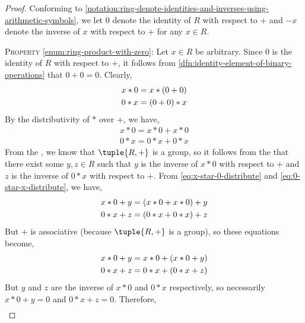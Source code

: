 \begin{proof}
    Conforming to \cref{notation:ring-denote-identities-and-inverses-using-arithmetic-symbols},
    we let \( 0 \) denote the identity of \( R \) with respect to \( + \) and \( -x \)
    denote the inverse of \( x \) with respect to \( + \) for any \( x \in R \).

    \vspace{0.3cm}
    \noindent
    \textsc{Property} \ref{enum:ring-product-with-zero}:
    Let \( x \in R \) be arbitrary. Since \( 0 \) is the identity of \( R \) with respect to \( + \),
    it follows from \cref{dfn:identity-element-of-binary-operations} that \( 0 + 0 = 0 \). Clearly,
    \begin{gather*}
        x \ast 0 = x \ast \mleft( 0 + 0 \mright)\\
        0 \ast x = \mleft( 0 + 0 \mright) \ast x
    \end{gather*}
    By the distributivity of \( \ast \) over \( + \), we have,
    \begin{gather}
        x \ast 0 = x \ast 0 + x \ast 0 \label{eq:x-star-0-distribute} \\
        0 \ast x = 0 \ast x + 0 \ast x \label{eq:0-star-x-distribute}
    \end{gather}
    From the , we know that \( \tuple{R, +} \) is a group, so it follows from the  that there exist
    some \( y,z \in R \) such that \( y \) is the inverse of \( x \ast 0 \) with respect to \( + \) and \( z \) is the inverse
    of \( 0 \ast x \) with respect to \( + \). From \eqref{eq:x-star-0-distribute} and \eqref{eq:0-star-x-distribute}, we have,
    \begin{gather*}
        x \ast 0 + y = \mleft( x \ast 0 + x \ast 0 \mright) + y\\
        0 \ast x + z = \mleft( 0 \ast x + 0 \ast x \mright) + z
    \end{gather*}
    But \( + \) is associative (because \( \tuple{R,+} \) is a group), so these equations become,
    \begin{gather*}
        x \ast 0 + y = x \ast 0 + \mleft( x \ast 0 + y \mright)\\
        0 \ast x + z = 0 \ast x + \mleft( 0 \ast x + z \mright)
    \end{gather*}
    But \( y \) and \( z \) are the inverse of \( x \ast 0 \) and \( 0 \ast x \) respectively, so necessarily \( x \ast 0 + y = 0 \)
    and \( 0 \ast x + z = 0 \). Therefore,
    \begin{gather*}

\end{gather*}
\end{proof}
